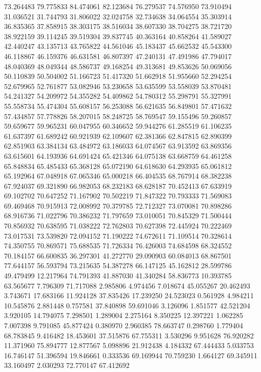 73.264483
79.775833
84.474061
82.123684
76.279537
74.576950
73.910494
31.036521
31.744793
31.806022
32.024758
32.734638
34.064554
35.303914
36.835365
37.858915
38.303175
38.516034
38.607330
38.704275
38.721720
38.922159
39.114245
39.519304
39.837745
40.363164
40.858264
41.589027
42.440247
43.135713
43.765822
44.561046
45.183437
45.662532
45.543300
46.118867
46.159376
46.631581
46.807397
47.240131
47.491986
47.794017
48.040369
48.049344
48.586737
49.168254
49.313681
49.853626
50.069056
50.110839
50.504002
51.166723
51.417320
51.662918
51.955660
52.294254
52.679965
52.761877
53.082946
53.230658
53.635599
53.558039
53.870481
54.241327
54.209972
54.355282
54.409862
54.780312
55.298791
55.327991
55.558734
55.474304
55.608157
56.253088
56.621635
56.849801
57.471632
57.434857
57.778826
58.207015
58.248725
58.769547
59.155496
59.260857
59.659677
59.965231
60.047955
60.346652
59.944276
61.285519
61.106235
61.637397
61.689242
60.921939
62.109607
62.381366
62.847815
62.890399
62.851903
63.384134
63.484972
63.186033
64.074567
63.913592
63.869356
63.615601
64.193936
64.691424
65.421346
64.075138
63.668759
64.461258
65.848834
65.485433
65.368128
65.072190
64.618630
64.293935
65.061812
65.192964
67.048918
67.065346
65.000218
66.404535
68.767914
68.382238
67.924037
69.321890
66.982053
68.232183
68.628187
70.452413
67.633919
69.102702
70.647252
71.167902
70.502219
71.847322
70.793333
71.569083
69.469468
70.915913
72.008992
70.379785
72.712327
73.070081
70.898286
68.916736
71.022796
70.386232
71.797659
73.010051
70.845329
71.500444
70.856932
70.638595
71.038222
72.762803
70.627398
72.445924
70.222469
73.017531
73.539820
72.094152
71.190222
74.672611
71.109514
70.328614
74.350755
70.869571
75.688535
71.726334
76.426003
74.684598
68.324552
70.184157
66.600835
36.297301
41.272770
29.090903
60.084013
68.867501
77.644157
56.593794
73.215635
54.387278
66.147125
45.162812
28.599786
49.479499
12.217964
74.791393
41.887030
41.340284
58.836773
10.393785
63.565677
7.796309
71.717088
2.985806
4.974456
7.018674
45.055267
20.462493
3.743671
17.683166
11.924128
37.835426
17.239250
24.523023
0.561928
4.984211
10.545876
2.881448
0.757581
37.840898
59.691046
3.126096
1.851577
42.521204
3.920105
14.794075
7.298501
1.289004
2.275164
8.350225
12.397221
1.062285
7.007398
9.791085
45.877424
0.380970
2.960385
78.663747
0.298760
1.779404
68.783845
9.416482
18.453601
37.515876
67.755311
3.530296
9.951628
76.920282
11.371960
75.894777
12.877567
5.098896
21.912438
4.184332
67.444433
5.033753
16.746147
51.396594
19.846661
0.333536
69.169944
70.759230
1.664127
69.345911
33.160497
2.030293
72.770147
67.412692
